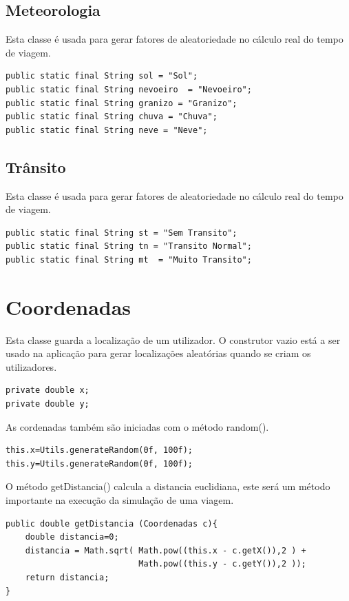 \subsection{Meteorologia}

Esta classe é usada para gerar fatores de aleatoriedade no cálculo real do tempo de viagem.

\begin{verbatim}
public static final String sol = "Sol"; 
public static final String nevoeiro  = "Nevoeiro"; 
public static final String granizo = "Granizo";
public static final String chuva = "Chuva";
public static final String neve = "Neve"; 
\end{verbatim}

\subsection{Trânsito}

Esta classe é usada para gerar fatores de aleatoriedade no cálculo real do tempo de viagem.

\begin{verbatim}
public static final String st = "Sem Transito"; 
public static final String tn = "Transito Normal"; 
public static final String mt  = "Muito Transito"; 
\end{verbatim}

\section{Coordenadas}

Esta classe guarda a localização de um utilizador. O construtor vazio está a ser usado na aplicação para gerar localizações aleatórias quando se criam os utilizadores. 

\begin{verbatim}
private double x;
private double y;
\end{verbatim}

As cordenadas também são iniciadas com o método random(). 
\begin{verbatim}
this.x=Utils.generateRandom(0f, 100f);
this.y=Utils.generateRandom(0f, 100f);
\end{verbatim}

O método getDistancia() calcula a distancia euclidiana, este será um método importante na execução da simulação de uma viagem. 
\begin{verbatim}
public double getDistancia (Coordenadas c){
    double distancia=0; 
    distancia = Math.sqrt( Math.pow((this.x - c.getX()),2 ) +
                           Math.pow((this.y - c.getY()),2 ));
    return distancia; 
}
\end{verbatim}

